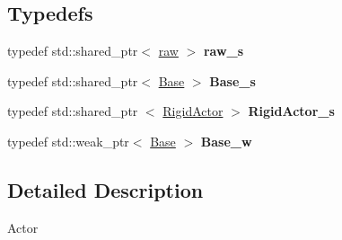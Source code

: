\subsection*{\-Typedefs}
\begin{DoxyCompactItemize}
\item 
\hypertarget{namespaceneb_1_1Actor_a30566a1a7dabe4decbe2a838107249c9}{typedef std\-::shared\-\_\-ptr$<$ \hyperlink{classneb_1_1Actor_1_1raw}{raw} $>$ {\bfseries raw\-\_\-s}}\label{namespaceneb_1_1Actor_a30566a1a7dabe4decbe2a838107249c9}

\item 
\hypertarget{namespaceneb_1_1Actor_af59a7cb82a0c7bb45c173613a9a8ede8}{typedef std\-::shared\-\_\-ptr$<$ \hyperlink{classneb_1_1Actor_1_1Base}{\-Base} $>$ {\bfseries \-Base\-\_\-s}}\label{namespaceneb_1_1Actor_af59a7cb82a0c7bb45c173613a9a8ede8}

\item 
\hypertarget{namespaceneb_1_1Actor_a7eca8c7ed010423d06109cb1c891086b}{typedef std\-::shared\-\_\-ptr\*
$<$ \hyperlink{classneb_1_1Actor_1_1RigidActor}{\-Rigid\-Actor} $>$ {\bfseries \-Rigid\-Actor\-\_\-s}}\label{namespaceneb_1_1Actor_a7eca8c7ed010423d06109cb1c891086b}

\item 
\hypertarget{namespaceneb_1_1Actor_a4f7242176f765e5804b49628b0bdc983}{typedef std\-::weak\-\_\-ptr$<$ \hyperlink{classneb_1_1Actor_1_1Base}{\-Base} $>$ {\bfseries \-Base\-\_\-w}}\label{namespaceneb_1_1Actor_a4f7242176f765e5804b49628b0bdc983}

\end{DoxyCompactItemize}


\subsection{\-Detailed \-Description}
\-Actor 